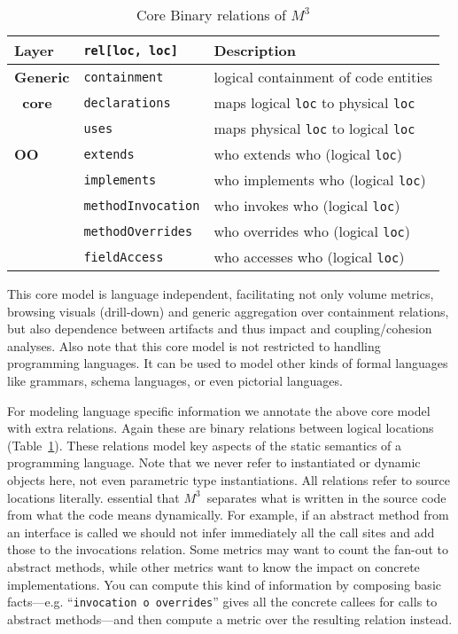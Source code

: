 \documentclass[conference]{IEEEtran}
\newcommand{\mthree}{\ensuremath{M^3}\xspace}
\begin{document}
\begin{table}[t]
\begin{tabularx}{\columnwidth}{|l|l|X|}\hline
 Layer & \lstinline!rel[loc, loc]! & Description \\ \hline 
\textbf{Generic} & \lstinline!containment! & logical containment of 
code entities \\
\textbf{~core} & \lstinline!declarations! & maps logical \lstinline!loc! to physical \lstinline!loc! \\
& \lstinline!uses! & maps physical \lstinline!loc! to logical \lstinline!loc! \\ \hline
 \textbf{OO} & \lstinline!extends! & who extends who (logical \lstinline!loc!) \\
& \lstinline!implements! & who implements who  (logical \lstinline!loc!) \\
& \lstinline!methodInvocation! & who invokes who (logical \lstinline!loc!) \\
& \lstinline!methodOverrides! & who overrides who (logical \lstinline!loc!) \\
& \lstinline!fieldAccess! & who accesses who (logical \lstinline!loc!)\\ \hline
\end{tabularx}
\caption{Core Binary relations of \mthree \label{table:core}}\vspace{-9mm}
\end{table}

This core model is language independent, facilitating not only volume metrics,
browsing visuals (drill-down) and generic aggregation over containment
relations, but also dependence between artifacts and thus impact and
coupling/cohesion analyses. Also note that this core model is not restricted
to handling programming languages. It can be used to model other kinds of
formal languages like grammars, schema languages, or even pictorial languages.

For modeling language specific information we annotate the above core model
with extra relations. Again these are binary relations between logical
locations (Table~\ref{table:core}). These relations model key aspects of the static semantics
of a programming language. Note that we never refer to instantiated or dynamic
objects here, not even parametric type instantiations. All relations refer to
source locations literally. 
essential that \mthree\  separates what is written in the source code from
what the code means dynamically. 
For example, if an abstract method from an
interface is called we should not infer immediately all the call sites and add
those to the invocations relation. Some metrics may want to count the fan-out
to abstract methods, while other metrics want to know the impact on concrete
implementations. You can compute this kind of information by composing basic
facts---e.g. ``\lstinline!invocation o overrides!'' gives all the concrete callees
for calls to abstract methods---and then compute a metric over the resulting
relation instead.
\end{document}
